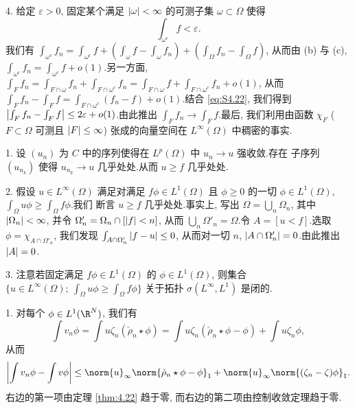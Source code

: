 4. 给定 $\varepsilon>0$, 固定某个满足 $\left|\omega\right|<\infty$ 的可测子集
$\omega\subset\Omega$ 使得
\begin{equation}
\int_{\omega^c}f<\varepsilon.
\tag{S1}
\label{eq:S4.22}
\end{equation}
我们有 $\int_{\omega^c}f_n=\int_{\omega^c}f+\left(\int_\omega f-\int_\omega f_n\right)+\left(\int_\Omega f_n-\int_\Omega f\right)$,
从而由 (b) 与 (c), $\int_{\omega^c}f_n=\int_{\omega^c}f+o(1)$.另一方面,
$\int_F f_n=\int_{F\cap\omega}f_n+\int_{F\cap\omega^c}f_n=\int_{F\cap\omega}f+\int_{F\cap\omega^c}f_n+o(1)$,
从而 $\int_F f_n-\int_F f=\int_{F\cap\omega^c}(f_n-f)+o(1)$.结合 \eqref{eq:S4.22},
我们得到 $\left|\int_F f_n-\int_F f\right|\le2\varepsilon+o(1)$.由此推出
$\int_F f_n\to\int_F f$.最后, 我们利用由函数 $\chi_F$ ($F\subset\Omega$ 可测且
$\left|F\right|\le\infty$) 张成的向量空间在 $L^\infty(\Omega)$ 中稠密的事实.


1. 设 $(u_n)$ 为 $C$ 中的序列使得在 $L^p(\Omega)$ 中 $u_n\to u$ 强收敛.存在
子序列 $(u_{n_k})$ 使得 $u_{n_k}\to u$ 几乎处处.从而 $u\ge f$ 几乎处处.

2. 假设 $u\in L^\infty(\Omega)$ 满足对满足 $f\phi\in L^1(\Omega)$ 且 $\phi\ge0$
的一切 $\phi\in L^1(\Omega)$, $\int_\Omega u\phi\ge\int_\Omega f\phi$.我们
断言 $u\ge f$ 几乎处处.事实上, 写出 $\Omega=\bigcup_n\Omega_n$, 其中
$\left|\Omega_n\right|<\infty$, 并令 $\Omega'_n=\Omega_n\cap[\left|f\right|<n]$, 从而
$\bigcup_n\Omega'_n=\Omega$.令 $A=[u<f]$.选取 $\phi=\chi_{A\cap\Omega'_n}$,
我们发现 $\int_{A\cap\Omega'_n}\left|f-u\right|\le0$, 从而对一切 $n$,
$\left|A\cap\Omega'_n\right|=0$.由此推出 $\left|A\right|=0$.

3. 注意若固定满足 $f\phi\in L^1(\Omega)$ 的 $\phi\in L^1(\Omega)$, 则集合
$\{u\in L^\infty(\Omega);\ \int_\Omega u\phi\ge\int_\Omega f\phi\}$ 关于拓扑
$\sigma(L^\infty,L^1)$ 是闭的.


1. 对每个 $\phi\in L^1(\R^N)$, 我们有
\begin{equation*}
\int v_n\phi=\int u\zeta_n(\check\rho_n\star\phi)
=\int u\zeta_n(\check\rho_n\star\phi-\phi)+\int u\zeta_n\phi,
\end{equation*}
从而
\begin{equation*}
\abs{\int v_n\phi-\int v\phi}\le\norm{u}_\infty\norm{\check\rho_n\star\phi-\phi}_1
+\norm{u}_\infty\norm{(\zeta_n-\zeta)\phi}_1.
\end{equation*}
右边的第一项由定理  \ref{thm:4.22} 趋于零, 而右边的第二项由控制收敛定理趋于零.

